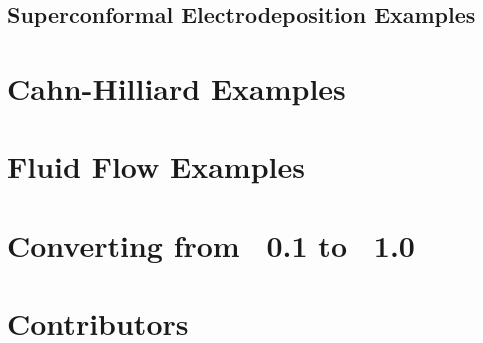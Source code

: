\documentclass[letterpaper,twoside,openright,10pt]{memoir}
\begin{document}
\newpage
\section*{Superconformal Electrodeposition Examples}








\chapter{Cahn-Hilliard Examples}



\chapter{Fluid Flow Examples}



\chapter{Converting from \FiPy{}~0.1 to \FiPy{}~1.0}
\label{chap:Update0.1to1.0}




\backmatter


\fussy

% 



\sloppy
\raggedright
\printindex

\fussy

\appendix 


\chapter*{Contributors}
\label{chap:Contributors}



\end{document}
